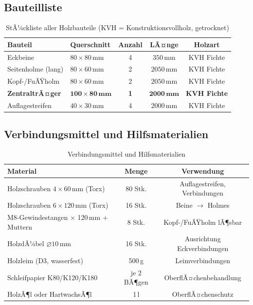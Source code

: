 ﻿\documentclass[12pt,a4paper]{article}
\theoremstyle{definition}
\theoremstyle{plain}
\theoremstyle{remark}
\begin{document}
\subsection{Bauteilliste}

\begin{table}[H]
\centering
\begin{tabular}{llccc}
\toprule
\textbf{Bauteil} & \textbf{Querschnitt} & \textbf{Anzahl} & \textbf{LÃ¤nge} & \textbf{Holzart}\\
\midrule
Eckbeine           & $80 \times 80\,\text{mm}$  & 4 & $350\,\text{mm}$ & KVH Fichte \\
Seitenholme (lang) & $80 \times 60\,\text{mm}$  & 2 & $2050\,\text{mm}$ & KVH Fichte \\
Kopf-/FuÃŸholm      & $80 \times 60\,\text{mm}$  & 2 & $2050\,\text{mm}$ & KVH Fichte \\
\textbf{ZentraltrÃ¤ger}  & $\mathbf{100 \times 80\,\text{mm}}$ & \textbf{1} & $\mathbf{2000\,\text{mm}}$ & \textbf{KVH Fichte} \\
Auflagestreifen    & $40 \times 30\,\text{mm}$  & 4 & $2000\,\text{mm}$ & KVH Fichte \\
\bottomrule
\end{tabular}
\caption{StÃ¼ckliste aller Holzbauteile (KVH = Konstruktionsvollholz, getrocknet)}
\end{table}

\subsection{Verbindungsmittel und Hilfsmaterialien}

\begin{table}[H]
\centering
\begin{tabular}{lcc}
\toprule
\textbf{Material} & \textbf{Menge} & \textbf{Verwendung}\\
\midrule
Holzschrauben $4 \times 60\,\text{mm}$ (Torx)  & 80 Stk. & Auflagestreifen, Verbindungen \\
Holzschrauben $6 \times 120\,\text{mm}$ (Torx) & 16 Stk. & Beine $\to$ Holmes \\
M8-Gewindestangen $\times$ 120\,mm + Muttern     &  8 Stk. & Kopf-/FuÃŸholm lÃ¶sbar \\
HolzdÃ¼bel $\varnothing 10\,\text{mm}$            & 16 Stk. & Ausrichtung Eckverbindungen\\
Holzleim (D3, wasserfest)                        & 500\,g   & Leimverbindungen \\
Schleifpapier K80/K120/K180                      & je 2 BÃ¶gen & OberflÃ¤chenbehandlung \\
HolzÃ¶l oder HartwachsÃ¶l                         & 1\,l     & OberflÃ¤chenschutz \\
\bottomrule
\end{tabular}
\caption{Verbindungsmittel und Hilfsmaterialien}
\end{table}
\end{document}
